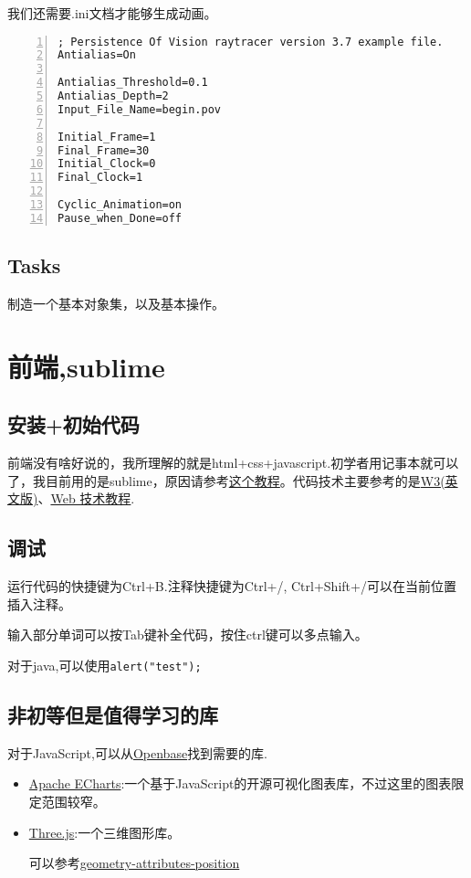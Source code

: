 \documentclass[11pt]{amsart}
\begin{document}
我们还需要.ini文档才能够生成动画。
\begin{lstlisting}[numbers=left,numberstyle=\tiny,numbersep=10pt]
; Persistence Of Vision raytracer version 3.7 example file.
Antialias=On

Antialias_Threshold=0.1
Antialias_Depth=2
Input_File_Name=begin.pov

Initial_Frame=1
Final_Frame=30
Initial_Clock=0
Final_Clock=1

Cyclic_Animation=on
Pause_when_Done=off
\end{lstlisting}
\subsection{Tasks}
制造一个基本对象集，以及基本操作。
\section{前端,sublime}
\subsection{安装+初始代码}
前端没有啥好说的，我所理解的就是html+css+javascript.初学者用记事本就可以了，我目前用的是sublime，原因请参考\href{https://www.bilibili.com/video/BV1vx411z7rb}{这个教程}。代码技术主要参考的是\href{https://www.quanzhanketang.com/}{W3(英文版)}、\href{http://www.w3school.com.cn/}{Web 技术教程}.
\subsection{调试}
运行代码的快捷键为Ctrl+B.注释快捷键为Ctrl+/, Ctrl+Shift+/可以在当前位置插入注释。

输入部分单词可以按Tab键补全代码，按住ctrl键可以多点输入。

对于java,可以使用\lstinline|alert("test");|
\subsection{非初等但是值得学习的库}
对于JavaScript,可以从\href{https://openbase.com/}{Openbase}找到需要的库.
\begin{itemize}
\item \href{https://echarts.apache.org/zh/index.html}{Apache ECharts}:一个基于JavaScript的开源可视化图表库，不过这里的图表限定范围较窄。
\item 
\href{https://threejs.org/manual/#zh/fundamentals}{Three.js}:一个三维图形库。

可以参考\href{https://dustinpfister.github.io/2021/06/07/threejs-buffer-geometry-attributes-position/}{geometry-attributes-position}
\end{itemize}
\end{document}
